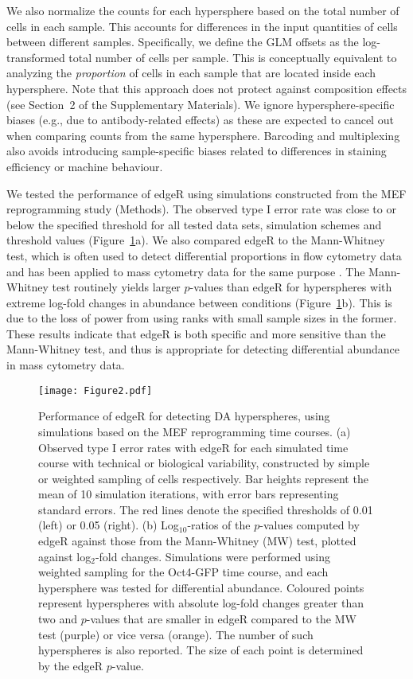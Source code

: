 \documentclass{article}
\newcommand{\suppcomponorm}{2}
\begin{document}
We also normalize the counts for each hypersphere based on the total number of cells in each sample.
This accounts for differences in the input quantities of cells between different samples.
Specifically, we define the GLM offsets as the log-transformed total number of cells per sample.
This is conceptually equivalent to analyzing the \textit{proportion} of cells in each sample that are located inside each hypersphere.
Note that this approach does not protect against composition effects (see Section~\suppcomponorm{} of the Supplementary Materials).
We ignore hypersphere-specific biases (e.g., due to antibody-related effects) as these are expected to cancel out when comparing counts from the same hypersphere.
Barcoding and multiplexing also avoids introducing sample-specific biases related to differences in staining efficiency or machine behaviour.

We tested the performance of edgeR using simulations constructed from the MEF reprogramming study (Methods).
The observed type I error rate was close to or below the specified threshold for all tested data sets, simulation schemes and threshold values (Figure~\ref{fig:testtest}a).
We also compared edgeR to the Mann-Whitney test, which is often used to detect differential proportions in flow cytometry data \cite{watson1992significance} and has been applied to mass cytometry data for the same purpose \cite{behbehani2015mass}.
The Mann-Whitney test routinely yields larger $p$-values than edgeR for hyperspheres with extreme log-fold changes in abundance between conditions (Figure~\ref{fig:testtest}b).
This is due to the loss of power from using ranks with small sample sizes in the former.
These results indicate that edgeR is both specific and more sensitive than the Mann-Whitney test, and thus is appropriate for detecting differential abundance in mass cytometry data.

\begin{figure}[bt]
    \begin{center}
        \texttt{[image: Figure2.pdf]}
    \end{center}
\caption{
Performance of edgeR for detecting DA hyperspheres, using simulations based on the MEF reprogramming time courses.
(a) Observed type I error rates with edgeR for each simulated time course with technical or biological variability, constructed by simple or weighted sampling of cells respectively.
Bar heights represent the mean of 10 simulation iterations, with error bars representing standard errors.
The red lines denote the specified thresholds of 0.01 (left) or 0.05 (right).
(b) Log$_{10}$-ratios of the $p$-values computed by edgeR against those from the Mann-Whitney (MW) test, plotted against log$_{2}$-fold changes.
Simulations were performed using weighted sampling for the Oct4-GFP time course, and each hypersphere was tested for differential abundance.
Coloured points represent hyperspheres with absolute log-fold changes greater than two and $p$-values that are smaller in edgeR compared to the MW test (purple) or vice versa (orange).
The number of such hyperspheres is also reported.
The size of each point is determined by the edgeR $p$-value.
}
\label{fig:testtest}
\end{figure}
\end{document}
